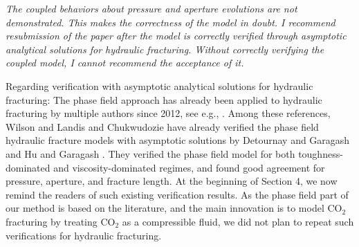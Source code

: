 \documentclass{elsarticle}
\newcommand{\review}[1]{ \textit{#1}}
\begin{document}
{{\review{ The coupled behaviors about pressure and aperture evolutions are not demonstrated. This makes the correctness of the model in doubt. I recommend resubmission of the paper after the model is correctly verified through asymptotic analytical solutions for hydraulic fracturing. Without correctly verifying the coupled model, I cannot recommend the acceptance of it. }

Regarding verification with asymptotic analytical solutions for hydraulic fracturing:
The phase field approach has already been applied to hydraulic fracturing by multiple authors since 2012, see e.g., \cite{bourdin2012variational, mikelic2014phase, yoshioka2016variational, wick2016fluid, mauthe2017hydraulic, ehlers2017phase, culp2017phase, heider2017modelling}. Among these references,
Wilson and Landis \cite{wilson2016phase} and Chukwudozie \cite{chukwudozie2016application} have already verified the phase field hydraulic fracture models with asymptotic solutions by Detournay and Garagash \cite{detournay2003near} and Hu
and Garagash \cite{hu2010plane}. They verified the phase field model for both toughness-dominated and viscosity-dominated regimes, and found good agreement for pressure, aperture, and fracture length. At the beginning of Section 4, we now remind the readers of such existing verification results.
As the phase field part of our method is based on the literature, and the main innovation is to model CO$_2$ fracturing by treating CO$_2$ as a compressible fluid, we did not plan to repeat such verifications for hydraulic fracturing.

}}
\end{document}
